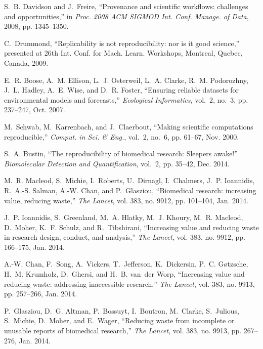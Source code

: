 \begin{singlespace}
\begin{thebibliography}{10}
	S.~B. Davidson and J.~Freire, ``Provenance and scientific workflows: challenges
	and opportunities,'' in \emph{Proc. 2008 ACM SIGMOD Int. Conf. Manage. of
		Data}, 2008, pp. 1345--1350.
	
	C.~Drummond, ``Replicability is not reproducibility: nor is it good science,''
	presented at {26th Int. Conf. for Mach. Learn. Workshops}, {Montreal, Quebec, Canada}, 2009.
	
	E.~R. Boose, A.~M. Ellison, L.~J. Osterweil, L.~A. Clarke, R.~M. Podorozhny,
	J.~L. Hadley, A.~E. Wise, and D.~R. Foster, ``Ensuring reliable datasets for
	environmental models and forecasts,'' \emph{Ecological Informatics}, vol.~2,
	no.~3, pp. 237--247, Oct. 2007.
	
	M.~Schwab, M.~Karrenbach, and J.~Claerbout, ``Making scientific computations
	reproducible,'' \emph{Comput. in Sci. \& Eng.}, vol.~2, no.~6, pp. 61--67,
	Nov. 2000.
	
	S.~A. Bustin, ``The reproducibility of biomedical research: Sleepers awake!''
	\emph{Biomolecular Detection and Quantification}, vol.~2, pp. 35--42, Dec.
	2014.
	
	M.~R. Macleod, S.~Michie, I.~Roberts, U.~Dirnagl, I.~Chalmers, J.~P. Ioannidis,
	R.~A.-S. Salman, A.-W. Chan, and P.~Glasziou, ``Biomedical research:
	increasing value, reducing waste,'' \emph{The Lancet}, vol. 383, no. 9912,
	pp. 101--104, Jan. 2014.
	
	J.~P. Ioannidis, S.~Greenland, M.~A. Hlatky, M.~J. Khoury, M.~R. Macleod,
	D.~Moher, K.~F. Schulz, and R.~Tibshirani, ``Increasing value and reducing
	waste in research design, conduct, and analysis,'' \emph{The Lancet}, vol.
	383, no. 9912, pp. 166--175, Jan. 2014.
	
	A.-W. Chan, F.~Song, A.~Vickers, T.~Jefferson, K.~Dickersin, P.~C. G{\o}tzsche,
	H.~M. Krumholz, D.~Ghersi, and H.~B. van~der Worp, ``Increasing value and
	reducing waste: addressing inaccessible research,'' \emph{The Lancet}, vol.
	383, no. 9913, pp. 257--266, Jan. 2014.
	
	P.~Glasziou, D.~G. Altman, P.~Bossuyt, I.~Boutron, M.~Clarke, S.~Julious,
	S.~Michie, D.~Moher, and E.~Wager, ``Reducing waste from incomplete or
	unusable reports of biomedical research,'' \emph{The Lancet}, vol. 383, no.
	9913, pp. 267--276, Jan. 2014.
	

\end{thebibliography}
\end{singlespace}
